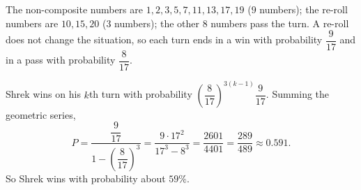 The non-composite numbers are $1,2,3,5,7,11,13,17,19$ ($9$ numbers); the re-roll numbers are $10,15,20$ ($3$ numbers); the other $8$ numbers pass the turn. A re-roll does not change the situation, so each turn ends in a win with probability $\dfrac{9}{17}$ and in a pass with probability $\dfrac{8}{17}$.

Shrek wins on his $k$th turn with probability $\left(\dfrac8{17}\right)^{3(k-1)}\dfrac9{17}$. Summing the geometric series,
\[P=\dfrac{\dfrac9{17}}{1-\left(\dfrac8{17}\right)^3}=\dfrac{9\cdot17^2}{17^3-8^3}=\dfrac{2601}{4401}=\dfrac{289}{489}\approx0.591.\]
So Shrek wins with probability about $\boxed{59\%}$.
